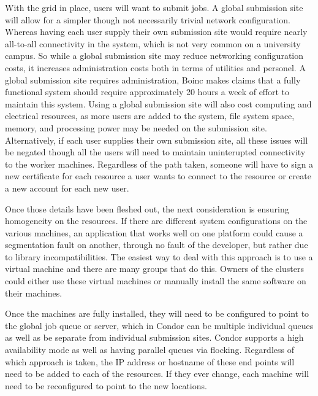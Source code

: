 \documentclass[conference]{IEEEtran}
\begin{document}
With the grid in place, users will want to submit jobs.  A global submission
site will allow for a simpler though not necessarily trivial network
configuration.  Whereas having each user supply their own submission site would
require nearly all-to-all connectivity in the system, which is not very common
on a university campus.  So while a global submission site may reduce
networking configuration costs, it increases administration costs both in terms
of utilities and personel.  A global submission site requires administration,
Boinc makes claims that a fully functional system should require approximately
20 hours a week of effort to maintain this system.  Using a global submission
site will also cost computing and electrical resources, as more users are added
to the system, file system space, memory, and processing power may be needed on
the submission site.  Alternatively, if each user supplies their own submission
site, all these issues will be negated though all the users will need to
maintain uninterupted connectivity to the worker machines.  Regardless of the
path taken, someone will have to sign a new certificate for each resource a
user wants to connect to the resource or create a new account for each new
user.

Once those details have been fleshed out, the next consideration is ensuring
homogeneity on the resources.  If there are different system configurations on
the various machines, an application that works well on one platform could
cause a segmentation fault on another, through no fault of the developer, but
rather due to library incompatibilities.  The easiest way to deal with this
approach is to use a virtual machine and there are many groups that do this.
Owners of the clusters could either use these virtual machines or manually
install the same software on their machines.

Once the machines are fully installed, they will need to be configured to point
to the global job queue or server, which in Condor can be multiple individual
queues as well as be separate from individual submission sites.  Condor
supports a high availability mode as well as having parallel queues via
flocking.  Regardless of which approach is taken, the IP address or hostname of
these end points will need to be added to each of the resources.  If they ever
change, each machine will need to be reconfigured to point to the new
locations.
\end{document}
